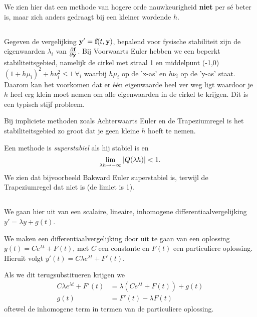 \documentclass{2wn20summary}
\begin{document}
		  We zien hier dat een methode van hogere orde nauwkeurigheid \textbf{niet} per s\'e beter %
		   is, maar zich anders gedraagt bij een kleiner wordende $h$.
		  
	\subsection{}
		Gegeven de vergelijking ${\textbf{y}}'={\textbf{f}} (t,{\textbf{y}} )$, bepalend voor fysische stabiliteit zijn de eigenwaarden $\lambda_i$ van $\frac{\partial {\textbf{f}}  }{\partial {\textbf{y}} }$. Bij Voorwaarts Euler hebben we een beperkt stabiliteitsgebied, namelijk de cirkel met straal 1 en middelpunt (-1,0) $(1+h \mu_i)^2 +h \nu_i^2 \le 1\ \forall_i$ waarbij $h\mu_i$ op de 'x-as' en $h \nu_i$ op de 'y-as' staat. Daarom kan het voorkomen dat er \'e\'en eigenwaarde heel ver weg ligt waardoor je $h$ heel erg klein moet nemen om alle eigenwaarden in de cirkel te krijgen. Dit is een typisch stijf probleem.		  
		
		Bij impliciete methoden zoals Achterwaarts Euler en de Trapeziumregel is het stabiliteitsgebied zo groot dat je geen kleine $h$ hoeft te nemen.
		
		\begin{define}
			Een methode is \textit{superstabiel} als hij stabiel is en
			\[
				\lim_{\lambda h \to -\infty} {\left|Q(\lambda h)\right|} < 1.
			 \]
			 We zien dat bijvoorbeeld Bakward Euler superstabiel is, terwijl de Trapeziumregel dat niet is (de limiet is 1).
		\end{define}

	\subsection{}
	
		We gaan hier uit van een scalaire, lineaire, inhomogene differentiaalvergelijking $y'=\lambda y + g(t)$.
		
		We maken een differentiaalvergelijking door uit te gaan van een oplossing $y(t) = C e^{\lambda t} +F(t)$, met $C$ een constante en $F(t)$ een particuliere oplossing. Hieruit volgt $y'(t) = C\lambda e^{\lambda t} + F'(t)$.
		
		Als we dit terugsubstitueren krijgen we
		\begin{align*}
			C \lambda e^{\lambda t} + F'(t) &= \lambda (C e^{\lambda t} +F(t)) + g(t) \\
			g(t) &= F'(t) - \lambda F(t)
		\end{align*}
		oftewel de inhomogene term in termen van de particuliere oplossing.
		
\end{document}
